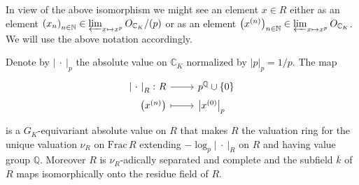 \begin{ntt}[]\label{not:tiltingElts}
	In view of the above isomorphism we might see an element $x \in R$
	either as an element 
	$\left( x_n \right)_{n \in \mathbb{N}} \in \varprojlim_{x \mapsto x^p} O_{\mathbb{C}_K}/ (p)$
	or as an element
	$\left( x^{(n)} \right)_{n \in \mathbb{N}} \in \varprojlim_{x \mapsto x^p} O_{\mathbb{C}_K}$.
	We will use the above notation accordingly.
\end{ntt}


\begin{lem}
	Denote by $\left| \ \cdot \ \right|_p$ the absolute value on $\mathbb{C}_K$
	normalized by $\left| p \right|_p = 1/p$.
	The map
	\begin{equation*}
	\begin{tikzcd}[row sep = 0ex
		,/tikz/column 1/.append style={anchor=base east}
		,/tikz/column 2/.append style={anchor=base west}]
		\left| \ \cdot \ \right|_R\colon R \arrow[r, "", rightarrow] &
		p^{\mathbb{Q}} \cup \left\{ 0 \right\} \\
		\left( x^{(n)} \right) \arrow[r, "", mapsto] & 
		\left| x^{(0)} \right|_p
	\end{tikzcd}
	\end{equation*} 
	is a $G_K$-equivariant absolute value on $R$ that makes
	$R$ the valuation ring for the unique valuation
	$\nu_R$ on $\mathrm{Frac}\, R$ extending
	$-\log_p \left| \ \cdot \ \right|_R$ on $R$
	and having value group $\mathbb{Q}$.
	Moreover $R$ is $\nu_R$-adically separated and complete
	and the subfield $\overline{k}$ of $R$ maps
	isomorphically onto the residue field of $R$.
\end{lem} 


